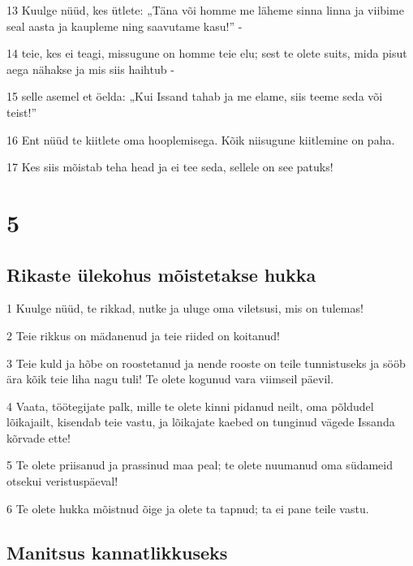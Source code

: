 \par 13 Kuulge nüüd, kes ütlete: „Täna või homme me läheme sinna linna ja viibime seal aasta ja kaupleme ning saavutame kasu!” -
\par 14 teie, kes ei teagi, missugune on homme teie elu; sest te olete suits, mida pisut aega nähakse ja mis siis haihtub -
\par 15 selle asemel et öelda: „Kui Issand tahab ja me elame, siis teeme seda või teist!”
\par 16 Ent nüüd te kiitlete oma hooplemisega. Kõik niisugune kiitlemine on paha.
\par 17 Kes siis mõistab teha head ja ei tee seda, sellele on see patuks!


\chapter{5}

\section*{Rikaste ülekohus mõistetakse hukka}

\par 1 Kuulge nüüd, te rikkad, nutke ja uluge oma viletsusi, mis on tulemas!
\par 2 Teie rikkus on mädanenud ja teie riided on koitanud!
\par 3 Teie kuld ja hõbe on roostetanud ja nende rooste on teile tunnistuseks ja sööb ära kõik teie liha nagu tuli! Te olete kogunud vara viimseil päevil.
\par 4 Vaata, töötegijate palk, mille te olete kinni pidanud neilt, oma põldudel lõikajailt, kisendab teie vastu, ja lõikajate kaebed on tunginud vägede Issanda kõrvade ette!
\par 5 Te olete priisanud ja prassinud maa peal; te olete nuumanud oma südameid otsekui veristuspäeval!
\par 6 Te olete hukka mõistnud õige ja olete ta tapnud; ta ei pane teile vastu.

\section*{Manitsus kannatlikkuseks}

